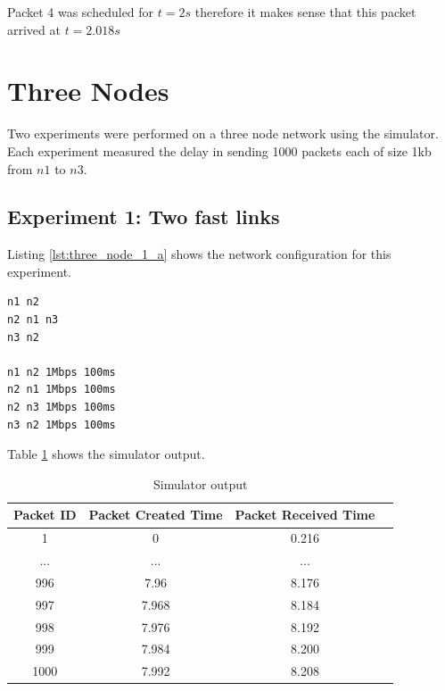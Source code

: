 \documentclass[fleqn,11pt]{article}
\begin{document}
\noindent
Packet 4 was scheduled for $t=2s$ therefore it makes sense that this packet
arrived at $t=2.018s$

\section{Three Nodes}

Two experiments were performed on a three node network using the simulator.
Each experiment measured the delay in sending 1000 packets each of size 1kb
from $n1$ to $n3$.

\subsection{Experiment 1: Two fast links}
\vspace{0.5cm}

Listing \ref{lst:three_node_1_a} shows the network configuration for this experiment.

\vspace{0.5cm}
\begin{lstlisting}[caption={Network configuration},label={lst:three_node_1_a}]
n1 n2
n2 n1 n3
n3 n2

n1 n2 1Mbps 100ms
n2 n1 1Mbps 100ms
n2 n3 1Mbps 100ms
n3 n2 1Mbps 100ms
\end{lstlisting}

\pagebreak

\noindent
Table \ref{tab:three_node_1_a} shows the simulator output.

\begin{table}[h]
  \caption{Simulator output}
  \label{tab:three_node_1_a}
  \begin{center}
    \begin{tabular}{cccc}
      \toprule
      Packet ID & Packet Created Time & Packet Received Time & \\
      \midrule
      1 & 0 & 0.216\\
      ... & ... & ...\\
      996 & 7.96 & 8.176\\
      997 & 7.968 & 8.184\\
      998 & 7.976 & 8.192\\
      999 & 7.984 & 8.200\\
      1000 & 7.992 & 8.208\\
      \bottomrule
    \end{tabular}
  \end{center}
\end{table}
\vspace{0.5cm}
\end{document}
